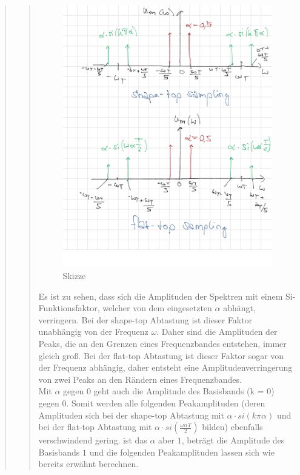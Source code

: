 \begin{quote}
\begin{quote}
         \begin{figure}[H]
            \centering
                \includegraphics[scale=0.3, trim = 0cm 0cm 0cm 0cm,
                clip]{./Bilder/vorbereitungsskizze}
                    \caption{Skizze}
        \end{figure}
        
        Es ist zu sehen, dass sich die Amplituden der Spektren mit einem
        Si-Funktionsfaktor, welcher von dem eingesetzten $\alpha$ abhängt, verringern.
        Bei der shape-top Abtastung ist dieser Faktor unabhängig von der Frequenz
        $\omega$. Daher sind die Amplituden der Peaks, die an den Grenzen eines
        Frequenzbandes entstehen, immer gleich groß.        
        Bei der flat-top Abtastung ist dieser Faktor sogar von der Frequenz abhängig, daher entsteht 
        eine Amplitudenverringerung von zwei Peaks an den Rändern eines
        Frequenzbandes.\\
        Mit $\alpha$ gegen $0$ geht auch die Amplitude des Basisbands (k = $0$) gegen
        $0$. Somit werden alle folgenden Peakamplituden (deren Amplituden sich bei der
        shape-top Abtastung mit $\alpha \cdot si(k \pi \alpha)$ und bei der flat-top
        Abtastung mit $\alpha \cdot si(\frac{\omega \alpha T}{2})$ bilden) ebenfalls
        verschwindend gering. ist das $\alpha$ aber $1$, beträgt die Amplitude des
        Basisbands $1$ und die folgenden Peakamplituden lassen sich wie bereits
        erwähnt berechnen.
        

\end{quote}
\end{quote}
